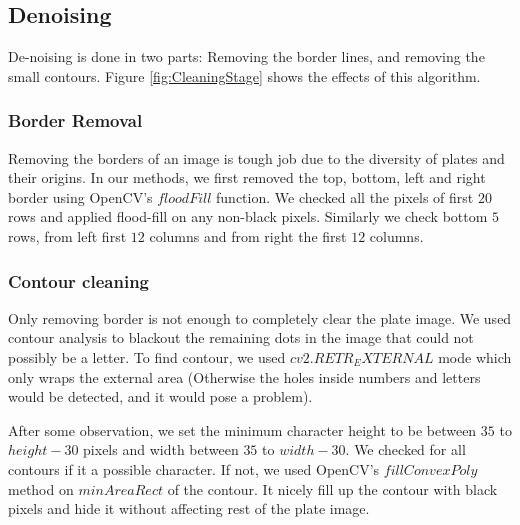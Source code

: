 \documentclass{standalone}
\begin{document}
\subsection{Denoising}
De-noising is done in two parts: Removing the border lines, and removing the small contours. Figure \ref{fig:CleaningStage} shows the effects of this algorithm.

\subsubsection{Border Removal}
Removing the borders of an image is tough job due to the diversity of plates and their origins. In our methods, we first removed the top, bottom, left and right border using OpenCV's $floodFill$ function. We checked all the pixels of first $20$ rows and applied flood-fill on any non-black pixels. Similarly we check bottom $5$ rows, from left first $12$ columns and from right the first $12$ columns.

\subsubsection{Contour cleaning}
Only removing border is not enough to completely clear the plate image. We used contour analysis to blackout the remaining dots in the image that could not possibly be a letter. To find contour, we used $cv2.RETR_EXTERNAL$ mode which only wraps the external area (Otherwise the holes inside numbers and letters would be detected, and it would pose a problem).

After some observation, we set the minimum character height to be between $35$ to $height-30$ pixels and width between $35$ to $width-30$. We checked for all contours if it a possible character. If not, we used OpenCV's $fillConvexPoly$ method on $minAreaRect$ of the contour. It nicely fill up the contour with black pixels and hide it without affecting rest of the plate image.
\end{document}
